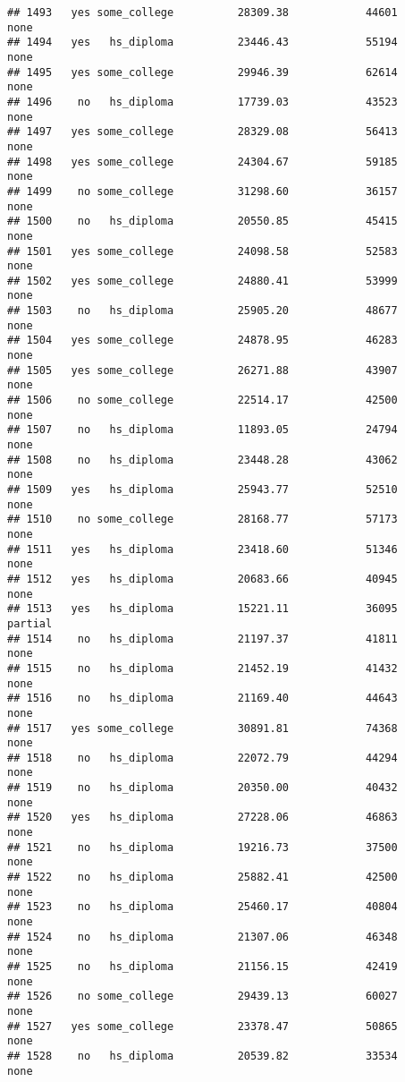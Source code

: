 \documentclass[
]{article}
\begin{document}
\begin{verbatim}
## 1493   yes some_college          28309.38            44601        none
## 1494   yes   hs_diploma          23446.43            55194        none
## 1495   yes some_college          29946.39            62614        none
## 1496    no   hs_diploma          17739.03            43523        none
## 1497   yes some_college          28329.08            56413        none
## 1498   yes some_college          24304.67            59185        none
## 1499    no some_college          31298.60            36157        none
## 1500    no   hs_diploma          20550.85            45415        none
## 1501   yes some_college          24098.58            52583        none
## 1502   yes some_college          24880.41            53999        none
## 1503    no   hs_diploma          25905.20            48677        none
## 1504   yes some_college          24878.95            46283        none
## 1505   yes some_college          26271.88            43907        none
## 1506    no some_college          22514.17            42500        none
## 1507    no   hs_diploma          11893.05            24794        none
## 1508    no   hs_diploma          23448.28            43062        none
## 1509   yes   hs_diploma          25943.77            52510        none
## 1510    no some_college          28168.77            57173        none
## 1511   yes   hs_diploma          23418.60            51346        none
## 1512   yes   hs_diploma          20683.66            40945        none
## 1513   yes   hs_diploma          15221.11            36095     partial
## 1514    no   hs_diploma          21197.37            41811        none
## 1515    no   hs_diploma          21452.19            41432        none
## 1516    no   hs_diploma          21169.40            44643        none
## 1517   yes some_college          30891.81            74368        none
## 1518    no   hs_diploma          22072.79            44294        none
## 1519    no   hs_diploma          20350.00            40432        none
## 1520   yes   hs_diploma          27228.06            46863        none
## 1521    no   hs_diploma          19216.73            37500        none
## 1522    no   hs_diploma          25882.41            42500        none
## 1523    no   hs_diploma          25460.17            40804        none
## 1524    no   hs_diploma          21307.06            46348        none
## 1525    no   hs_diploma          21156.15            42419        none
## 1526    no some_college          29439.13            60027        none
## 1527   yes some_college          23378.47            50865        none
## 1528    no   hs_diploma          20539.82            33534        none

\end{verbatim}
\end{document}

